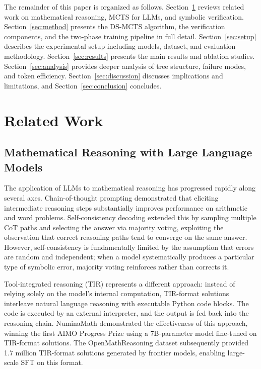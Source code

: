 \documentclass[11pt,a4paper]{article}
\begin{document}
The remainder of this paper is organized as follows. Section~\ref{sec:related}
reviews related work on mathematical reasoning, MCTS for LLMs, and symbolic
verification. Section~\ref{sec:method} presents the DS-MCTS algorithm, the
verification components, and the two-phase training pipeline in full detail.
Section~\ref{sec:setup} describes the experimental setup including models,
dataset, and evaluation methodology. Section~\ref{sec:results} presents the
main results and ablation studies. Section~\ref{sec:analysis} provides deeper
analysis of tree structure, failure modes, and token efficiency.
Section~\ref{sec:discussion} discusses implications and limitations, and
Section~\ref{sec:conclusion} concludes.


\section{Related Work}
\label{sec:related}

\subsection{Mathematical Reasoning with Large Language Models}

The application of LLMs to mathematical reasoning has progressed rapidly along
several axes. Chain-of-thought prompting \citep{wei2022chain} demonstrated that
eliciting intermediate reasoning steps substantially improves performance on
arithmetic and word problems. Self-consistency decoding
\citep{wang2023selfconsistency} extended this by sampling multiple CoT paths and
selecting the answer via majority voting, exploiting the observation that
correct reasoning paths tend to converge on the same answer. However,
self-consistency is fundamentally limited by the assumption that errors are
random and independent; when a model systematically produces a particular type
of symbolic error, majority voting reinforces rather than corrects it.

Tool-integrated reasoning (TIR) represents a different approach: instead of
relying solely on the model's internal computation, TIR-format solutions
interleave natural language reasoning with executable Python code blocks. The
code is executed by an external interpreter, and the output is fed back into the
reasoning chain. NuminaMath \citep{numina2024winning} demonstrated the
effectiveness of this approach, winning the first AIMO Progress Prize using a
7B-parameter model fine-tuned on TIR-format solutions. The OpenMathReasoning
dataset \citep{nvidia2025openmath} subsequently provided 1.7 million TIR-format
solutions generated by frontier models, enabling large-scale SFT on this format.
\end{document}
